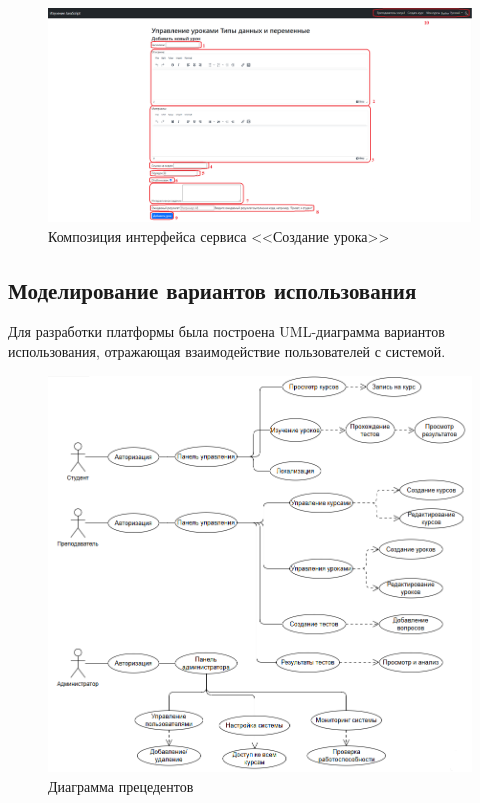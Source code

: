 \begin{figure}[h]
	\centering
	\includegraphics[width=1\linewidth]{images/создатьурок}
	\caption{Композиция интерфейса сервиса <<Создание урока>>}
	\label{templ:image12}
\end{figure}

\clearpage
\subsection{Моделирование вариантов использования}

Для разработки платформы была построена UML-диаграмма вариантов использования, отражающая взаимодействие пользователей с системой.

\begin{figure}[H]
	\centering
	\includegraphics[width=\linewidth]{images/UML}
	\caption{Диаграмма прецедентов}
	\label{fig:usecase_diagram}
\end{figure}


